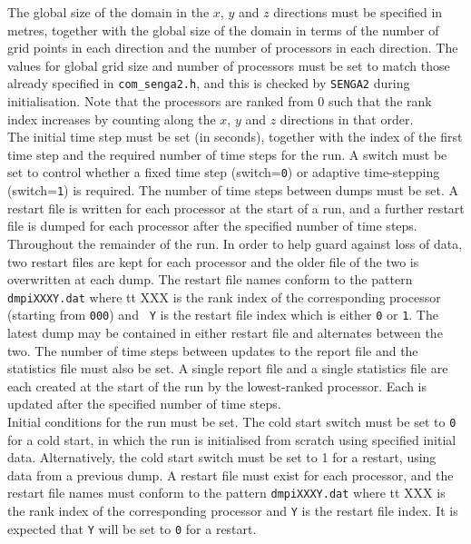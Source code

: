 \documentclass[dvips]{article}
\begin{document}
\noindent
The global size of the domain in the $x$, $y$ and $z$ directions
must be specified in metres, together with the global size of the domain in
terms of the number of grid points in each direction and the number of
processors in each direction.  The values for global grid size and number of
processors must be set to match those already specified in {\tt com\_senga2.h},
and this is checked by {\tt SENGA2} during initialisation.  Note that the
processors are ranked from 0 such that the rank index increases by counting
along the $x$, $y$ and $z$ directions in that order.\\

\noindent
The initial time step must be set (in seconds), together with the index of
the first
time step and the required number of time steps for the run.  A switch
must be set to control whether a fixed time step (switch={\tt 0}) or adaptive
time-stepping (switch={\tt 1}) is required.
The number of time steps between dumps must be set.  A restart file is
written for each processor at the start of a run, and a further restart
file is dumped for each processor after the specified number of time steps.
Throughout the remainder of the run.  In order to help guard against loss of
data, two restart files are kept for each
processor and the older file of the two is overwritten at each dump.
The restart file names conform to the pattern
{\tt dmpiXXXY.dat} where {tt XXX} is the rank
index of the corresponding processor (starting from {\tt 000}) and {\tt
Y} is the
restart file index which is either {\tt 0} or {\tt 1}.  The latest dump may be
contained in either restart file and alternates between the two.
The number of time steps between updates to the report file and the
statistics file must also be set.  A single report file
and a single statistics file are each created at the start of the run by the
lowest-ranked processor.  Each is updated after the specified number
of time steps.\\

\noindent
Initial conditions for the run must be set.  The cold start switch
must be set to {\tt 0} for a cold start, in which the run is initialised from
scratch using specified initial data.  Alternatively, the cold start
switch must be set to 1 for a restart, using data from a previous dump.
A restart file must exist for each processor, and the restart file names must
conform to the pattern {\tt dmpiXXXY.dat} where {tt XXX} is the rank
index of the corresponding processor and {\tt Y} is the restart file index.
It is expected that {\tt Y} will be set to {\tt 0} for a restart.\\
\end{document}
